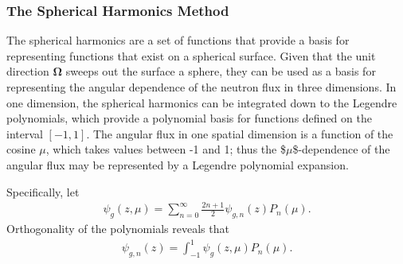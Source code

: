 \documentclass[11pt]{article}
\renewcommand\vec{\mathbf}
\begin{document}
\subsubsection{The Spherical Harmonics Method}
\label{sec:orgheadline55}
The spherical harmonics are a set of functions that provide a basis for representing functions that exist on a spherical surface.  Given that the unit direction \(\vec{\Omega}\) sweeps out the surface a sphere, they can be used as a basis for representing the angular dependence of the neutron flux in three dimensions.  In one dimension, the spherical harmonics can be integrated down to the Legendre polynomials, which provide a polynomial basis for functions defined on the interval \([-1,1]\).  The angular flux in one spatial dimension is a function of the cosine \(\mu\), which takes values between -1 and 1; thus the \$\(\mu\)\$-dependence of the angular flux may be represented by a Legendre polynomial expansion.

Specifically, let
\begin{align}
  \psi_g(z,\mu) = \sum_{n=0}^\infty \frac{2n+1}{2} \psi_{g,n}(z) P_n(\mu).
\end{align}
Orthogonality of the polynomials reveals that
\begin{align}
  \psi_{g,n}(z) = \int_{-1}^1 \psi_g(z,\mu) P_n(\mu).
\end{align}
\end{document}
